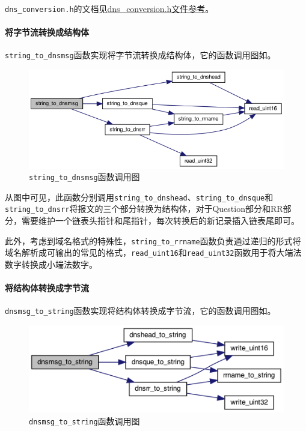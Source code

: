 \documentclass[lang=cn,11pt,a4paper,cite=authornum]{paper}
\begin{document}
\texttt{dns_conversion.h}的文档见\href{run:./APIdoc/dns__conversion_8h.html}{dns\_conversion.h文件参考}。

\paragraph{将字节流转换成结构体}

\texttt{string_to_dnsmsg}函数实现将字节流转换成结构体，它的函数调用图如。

\begin{figure}[htbp]

    \centering
    \includegraphics[width=0.7\linewidth]{./APIdoc/dns__conversion_8c_a0f89102e256c499ffa19784791cb68f6_cgraph.png}
    \caption{\texttt{string_to_dnsmsg}函数调用图\label{fig:string_to_dnsmsg_call}}

\end{figure}

从图中可见，此函数分别调用\texttt{string_to_dnshead}、\texttt{string_to_dnsque}和\texttt{string_to_dnsrr}将报文的三个部分转换为结构体，对于Question部分和RR部分，需要维护一个链表头指针和尾指针，每次转换后的新记录插入链表尾即可。

此外，考虑到域名格式的特殊性，\texttt{string_to_rrname}函数负责通过递归的形式将域名解析成可输出的常见的格式，\texttt{read_uint16}和\texttt{read_uint32}函数用于将大端法数字转换成小端法数字。

\paragraph{将结构体转换成字节流}

\texttt{dnsmsg_to_string}函数实现将结构体转换成字节流，它的函数调用图如。

\begin{figure}[htbp]

    \centering
    \includegraphics[width=0.7\linewidth]{./APIdoc/dns__conversion_8c_aa893e182a92c2ccf5644c1f8a12fba37_cgraph.png}
    \caption{\texttt{dnsmsg_to_string}函数调用图\label{fig:dnsmsg_to_string_call}}

\end{figure}
\end{document}
